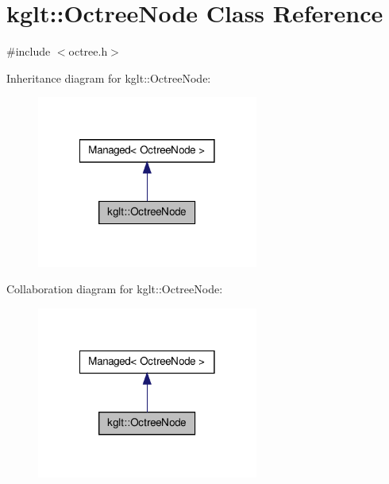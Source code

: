 \hypertarget{classkglt_1_1_octree_node}{\section{kglt\-:\-:Octree\-Node Class Reference}
\label{classkglt_1_1_octree_node}
}


{\ttfamily \#include $<$octree.\-h$>$}



Inheritance diagram for kglt\-:\-:Octree\-Node\-:\nopagebreak
\begin{figure}[H]
\begin{center}
\leavevmode
\includegraphics[width=206pt]{classkglt_1_1_octree_node__inherit__graph}
\end{center}
\end{figure}


Collaboration diagram for kglt\-:\-:Octree\-Node\-:\nopagebreak
\begin{figure}[H]
\begin{center}
\leavevmode
\includegraphics[width=206pt]{classkglt_1_1_octree_node__coll__graph}
\end{center}
\end{figure}

